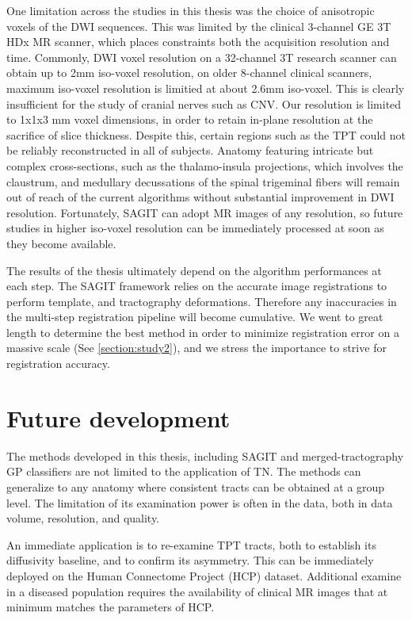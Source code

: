 One limitation across the studies in this thesis was the choice of anisotropic voxels of the DWI sequences. This was limited by the clinical 3-channel GE 3T HDx MR scanner, which places constraints both the acquisition resolution and time. Commonly, DWI voxel resolution on a 32-channel 3T research scanner can obtain up to 2mm iso-voxel resolution, on older 8-channel clinical scanners, maximum iso-voxel resolution is limitied at about 2.6mm iso-voxel. This is clearly insufficient for the study of cranial nerves such as CNV. Our resolution is limited to 1x1x3 mm voxel dimensions, in order to retain in-plane resolution at the sacrifice of slice thickness. Despite this, certain regions such as the TPT could not be reliably reconstructed in all of subjects. Anatomy featuring intricate but complex cross-sections, such as the thalamo-insula projections, which involves the claustrum, and medullary decussations of the spinal trigeminal fibers will remain out of reach of the current algorithms without substantial improvement in DWI resolution. Fortunately, SAGIT can adopt MR images of any resolution, so future studies in higher iso-voxel resolution can be immediately processed at soon as they become available. 

The results of the thesis ultimately depend on the algorithm performances at each step. The SAGIT framework relies on the accurate image registrations to perform template, and tractography deformations. Therefore any inaccuracies in the multi-step registration pipeline will become cumulative. We went to great length to determine the best method in order to minimize registration error on a massive scale (See \ref{section:study2}), and we stress the importance to strive for registration accuracy. 



\section{Future development}

The methods developed in this thesis, including SAGIT and merged-tractography GP classifiers are not limited to the application of TN. The methods can generalize to any anatomy where consistent tracts can be obtained at a group level. The limitation of its examination power is often in the data, both in data volume, resolution, and quality. 

An immediate application is to re-examine TPT tracts, both to establish its diffusivity baseline, and to confirm its asymmetry. This can be immediately deployed on the Human Connectome Project (HCP) dataset. Additional examine in a diseased population requires the availability of clinical MR images that at minimum matches the parameters of HCP. 

